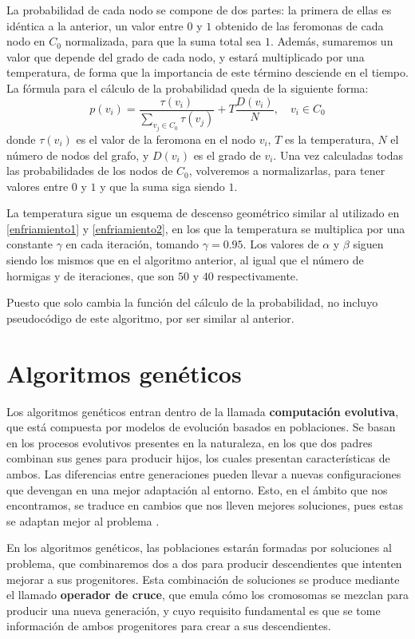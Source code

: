 La probabilidad de cada nodo se compone de dos partes: la primera de ellas es idéntica
a la anterior, un valor entre $0$ y $1$ obtenido de las feromonas de cada nodo en $C_0$
normalizada, para que la suma total sea $1$. Además, sumaremos un valor que depende
del grado de cada nodo, y estará multiplicado por una temperatura, de forma que la
importancia de este término desciende en el tiempo. La fórmula para el cálculo
de la probabilidad queda de la siguiente forma:
\[ p(v_i) = \frac{\tau(v_i)}{\sum\limits_{v_j \in C_0} \tau(v_j)} + T \frac{D(v_i)}{N}, \quad v_i \in C_0 \]
donde $\tau(v_i)$ es el valor de la feromona en el nodo $v_i$, $T$ es la temperatura,
$N$ el número de nodos del grafo, y $D(v_i)$ es el grado de $v_i$. Una vez calculadas
todas las probabilidades de los nodos de $C_0$, volveremos a normalizarlas, para tener
valores entre $0$ y $1$ y que la suma siga siendo $1$.

La temperatura sigue un esquema de descenso geométrico similar al utilizado en
\autoref{enfriamiento1} y \autoref{enfriamiento2}, en los que la temperatura se multiplica
por una constante $\gamma$ en cada iteración, tomando $\gamma = 0.95$. Los valores
de $\alpha$ y $\beta$ siguen siendo los mismos que en el algoritmo anterior, al
igual que el número de hormigas y de iteraciones, que son $50$ y $40$ respectivamente.

Puesto que solo cambia la función del cálculo de la probabilidad, no incluyo pseudocódigo
de este algoritmo, por ser similar al anterior.

\section{Algoritmos genéticos}\label{genetico}

Los algoritmos genéticos entran dentro de la llamada \textbf{computación evolutiva},
que está compuesta por modelos de evolución basados en poblaciones. Se basan en
los procesos evolutivos presentes en la naturaleza, en los que dos padres combinan
sus genes para producir hijos, los cuales presentan características de ambos.
Las diferencias entre generaciones pueden llevar a nuevas configuraciones que
devengan en una mejor adaptación al entorno. Esto, en el ámbito que nos encontramos,
se traduce en cambios que nos lleven mejores soluciones, pues estas se adaptan
mejor al problema \citep{herrera:2014}.

En los algoritmos genéticos, las poblaciones estarán formadas por soluciones al
problema, que combinaremos dos a dos para producir descendientes que intenten mejorar
a sus progenitores. Esta combinación de soluciones se produce mediante el llamado
\textbf{operador de cruce}, que emula cómo los cromosomas se mezclan para producir
una nueva generación, y cuyo requisito fundamental es que se tome información de
ambos progenitores para crear a sus descendientes.

